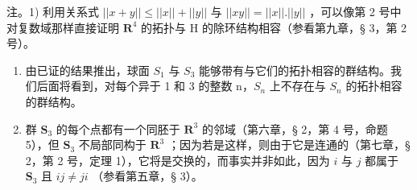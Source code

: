 注。1) 利用关系式 \(||x + y|| \leqslant ||x|| + ||y||\) 与 \(||xy|| = ||x||.||y||\) ，可以像第 2 号中对复数域那样直接证明 \(\mathbf{R}^4\) 的拓扑与 H 的除环结构相容（参看第九章，§ 3，第 2 号）。

\begin{enumerate}
\def\labelenumi{\arabic{enumi})}
\setcounter{enumi}{1}
\item
  由已证的结果推出，球面 \(S_{1}\) 与 \(S_{3}\) 能够带有与它们的拓扑相容的群结构。我们后面将看到，对每个异于 1 和 3 的整数 n，\(S_{n}\) 上不存在与 \(S_{n}\) 的拓扑相容的群结构。
\item
  群 \(\mathbf{S}_3\) 的每个点都有一个同胚于 \(\mathbf{R}^3\) 的邻域（第六章，§ 2，第 4 号，命题 5），但 \(\mathbf{S}_3\) 不局部同构于 \(\mathbf{R}^3\) ；因为若是这样，则由于它是连通的（第七章，§ 2，第 2 号，定理 1），它将是交换的，而事实并非如此，因为 \(i\) 与 \(j\) 都属于 \(\mathbf{S}_3\) 且 \(ij \neq ji\) （参看第五章，§ 3）。
\end{enumerate}

